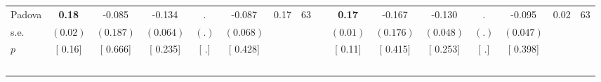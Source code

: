\begin{longtable}{L{8em} c c c c c c c p{1em} c c c c c c c}
\quad \quad \quad Padova& \textbf{     0.18} &    -0.085 &    -0.134 &         . &    -0.087 &      0.17 &        63 & & \textbf{     0.17} &    -0.167 &    -0.130 &         . &    -0.095 &      0.02 &        63  \\*
\quad \quad \quad \quad s.e.& $ (     0.02)$ & $ (    0.187)$ & $ (    0.064)$ & $ (        .)$ & $ (    0.068)$ & & & & $ (     0.01)$ & $ (    0.176)$ & $ (    0.048)$ & $ (        .)$ & $ (    0.047)$ & &  \\*
\quad \quad \quad \quad $ p$ & [     0.16] & [    0.666] & [    0.235] & [        .] & [    0.428] & & & & [     0.11] & [    0.415] & [    0.253] & [        .] & [    0.398] & &  \\[1em]
~\\[1em]
\end{longtable}